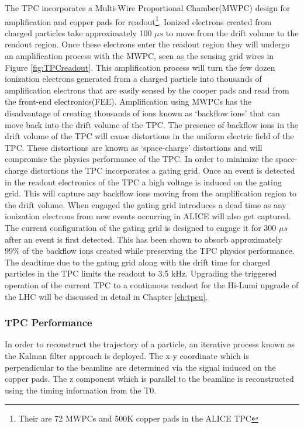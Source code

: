 The TPC incorporates a Multi-Wire Proportional Chamber(MWPC) design for amplification and copper pads for readout\footnote{Their are 72 MWPCs and 500K copper pads in the ALICE TPC}. Ionized electrons created from charged particles take approximately 100 $\mu s$ to move from the drift volume to the readout region.  Once these electrons enter the readout region they will undergo an amplification process with the MWPC, seen as the sensing grid wires in Figure \ref{fig:TPCreadout}.  This amplification process will turn the few dozen ionization electrons generated from a charged particle into thousands of amplification electrons that are easily sensed by the cooper pads and read from the front-end electronics(FEE).  Amplification using MWPCs has the disadvantage of creating thousands of ions known as `backflow ions' that can move back into the drift volume of the TPC.  The presence of backflow ions in the drift volume of the TPC will cause distortions in the uniform electric field of the TPC.  These distortions are known as `space-charge' distortions and will compromise the physics performance of the TPC.  In order to minimize the space-charge distortions the TPC incorporates a gating grid\cite{Tangwancharoen:2016dq}.  Once an event is detected in the readout electronics of the TPC a high voltage is induced on the gating grid.  This will capture any backflow ions moving from the amplification region to the drift volume.  When engaged the gating grid introduces a dead time as any ionization electrons from new events occurring in ALICE will also get captured.  The current configuration of the gating grid is designed to engage it for 300 $\mu s$ after an event is first detected.  This has been shown to absorb approximately 99\% of the backflow ions created while preserving the TPC physics performance.  The deadtime due to the gating grid along with the drift time for charged particles in the TPC limits the readout to 3.5 kHz.  Upgrading the triggered operation of the current TPC to a continuous readout for the Hi-Lumi upgrade of the LHC will be discussed in detail in Chapter \ref{ch:tpcu}.

\subsubsection{TPC Performance}\label{sec:tpcper}

In order to reconstruct the trajectory of a particle, an iterative process known as the Kalman filter approach is deployed.  The x-y coordinate which is perpendicular to the beamline are determined via the signal induced on the copper pads.  The z component which is parallel to the beamline is reconstructed using the timing information from the T0.  

